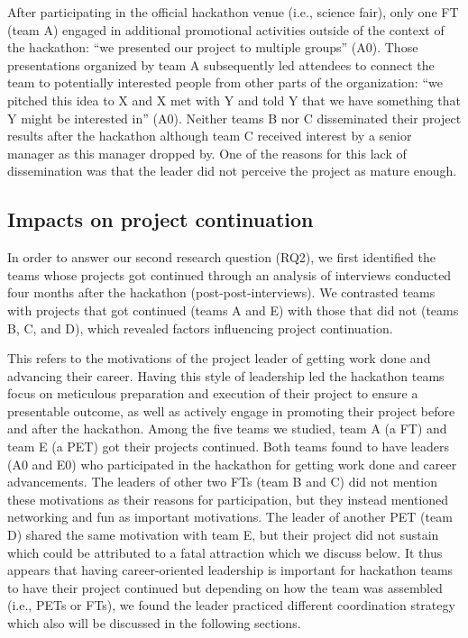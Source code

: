 \documentclass{hcij}
\begin{document}
After participating in the official hackathon venue (i.e., science fair), only one FT (team A) engaged in additional promotional activities outside of the context of the hackathon: “we presented our project to multiple groups” (A0). Those presentations organized by team A subsequently led attendees to connect the team to potentially interested people from other parts of the organization:  “we pitched this idea to X and X met with Y and told Y that we have something that Y might be interested in” (A0). Neither teams B nor C disseminated their project results after the hackathon although team C received interest by a senior manager as this manager dropped by.  One of the reasons for this lack of dissemination was that the leader did not perceive the project as mature enough.

\subsection{Impacts on project continuation}
In order to answer our second research question (RQ2), we first identified the teams whose projects got continued through an analysis of interviews conducted four months after the hackathon (post-post-interviews). We contrasted teams with projects that got continued (teams A and E) with those that did not (teams B, C, and D), which revealed factors influencing project continuation.

This refers to the motivations of the project leader of getting work done and advancing their career. Having this style of leadership led the hackathon teams focus on meticulous preparation and execution of their project to ensure a presentable outcome, as well as actively engage in promoting their project before and after the hackathon. Among the five teams we studied, team A (a FT) and team E (a PET) got their projects continued. Both teams found to have leaders (A0 and E0) who participated in the hackathon for getting work done and career advancements. The leaders of other two FTs (team B and C) did not mention these motivations as their reasons for participation, but they instead mentioned networking and fun as important motivations. The leader of another PET (team D) shared the same motivation with team E, but their project did not sustain which could be attributed to a fatal attraction which we discuss below. It thus appears that having career-oriented leadership is important for hackathon teams to have their project continued but depending on how the team was assembled (i.e., PETs or FTs), we found the leader practiced different coordination strategy which also will be discussed in the following sections.
\end{document}

